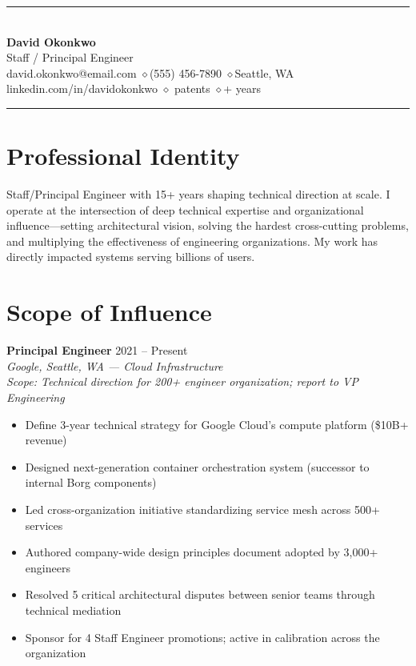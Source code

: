 \documentclass[11pt,a4paper]{article}
\begin{document}
\begin{center}
\textcolor{accent}{\rule{4cm}{0.8pt}}\\[0.7em]
{\fontsize{28}{32}\selectfont\bfseries David Okonkwo}\\[0.4em]
{\Large Staff / Principal Engineer}\\[0.4em]
{\small david.okonkwo@email.com \quad$\diamond$\quad (555) 456-7890 \quad$\diamond$\quad Seattle, WA}\\[0.2em]
{\small linkedin.com/in/davidokonkwo \quad$\diamond$ patents \quad$\diamond$+ years}\\[0.4em]
\textcolor{accent}{\rule{4cm}{0.8pt}}
\end{center}

\vspace{0.5em}

\section{Professional Identity}
Staff/Principal Engineer with 15+ years shaping technical direction at scale. I operate at the intersection of deep technical expertise and organizational influence---setting architectural vision, solving the hardest cross-cutting problems, and multiplying the effectiveness of engineering organizations. My work has directly impacted systems serving billions of users.

\section{Scope of Influence}

\noindent\textbf{Principal Engineer} \hfill 2021 -- Present\\
\textit{Google, Seattle, WA --- Cloud Infrastructure}\\[0.3em]
\textit{Scope: Technical direction for 200+ engineer organization; report to VP Engineering}
\begin{itemize}[leftmargin=1.5em,nosep,label={\color{accent}\textendash}]
\item Define 3-year technical strategy for Google Cloud's compute platform (\$10B+ revenue)
\item Designed next-generation container orchestration system (successor to internal Borg components)
\item Led cross-organization initiative standardizing service mesh across 500+ services
\item Authored company-wide design principles document adopted by 3,000+ engineers
\item Resolved 5 critical architectural disputes between senior teams through technical mediation
\item Sponsor for 4 Staff Engineer promotions; active in calibration across the organization
\end{itemize}
\vspace{0.5em}
\end{document}

